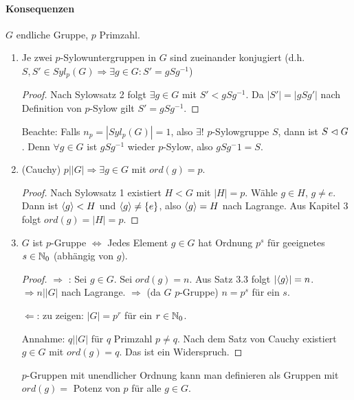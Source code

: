 \documentclass[12pt,a4paper]{scrartcl}
\begin{document}
\paragraph{Konsequenzen}
$G$ endliche Gruppe, $p$ Primzahl.
\begin{enumerate}
	\item Je zwei $p$-Sylowuntergruppen in $G$ sind zueinander konjugiert (d.h. $S, S'\in Syl_p(G) \Rightarrow \exists g\in G: S' = gSg^{-1}$)
	\begin{proof}
		Nach Sylowsatz 2 folgt $\exists g\in G$ mit $S'<gSg^{-1}$. Da $|S'| = |gSg'|$ nach Definition von $p$-Sylow gilt $S' = gSg^{-1}$.
	\end{proof}
	
	Beachte: Falls $n_p  = |Syl_p(G)| = 1$, also $\exists!$ $p$-Sylowgruppe $S$, dann ist $S\vartriangleleft G$. Denn $\forall g\in G$ ist $gSg^{-1}$ wieder $p$-Sylow, also $gSg^-1 = S$.
	
	\item (Cauchy) $p||G|\Rightarrow \exists g\in G$ mit $ord(g) = p$.
	\begin{proof}
		Nach Sylowsatz 1 existiert $H<G$ mit $|H| = p$. Wähle $g\in H$, $g\neq e$. Dann ist $\langle g\rangle <H$ und $\langle g\rangle \neq \{e\}$, also $\langle g\rangle = H$ nach Lagrange. Aus Kapitel 3 folgt $ord(g) = |H| = p$.
	\end{proof}
	\item $G$ ist $p$-Gruppe $\Leftrightarrow $ Jedes Element $g\in G$ hat Ordnung $p^s$ für geeignetes $s\in \mathbb N_0$ (abhängig von $g$).
	\begin{proof}
		\glqq$\Rightarrow$ \grqq: Sei $g\in G$. Sei $ord(g) = n$. Aus Satz 3.3 folgt $|\langle g\rangle| = n$. $\Rightarrow n||G|$ nach Lagrange. $\Rightarrow$ (da $G$ $p$-Gruppe) $n = p^s$ für ein $s$.
		
		\grqq $\Leftarrow$\grqq: zu zeigen: $|G| = p^r$ für ein $r\in\mathbb N_0$.
		
		Annahme: $q||G|$ für $q$ Primzahl $p\neq q$. Nach dem Satz von Cauchy existiert $g\in G$ mit $ord(g) = q$. Das ist ein Widerspruch.
	\end{proof}
	\begin{bem}
		$p$-Gruppen mit unendlicher Ordnung kann man definieren als Gruppen mit $ord(g) = $ Potenz von $p$ für alle $g\in G$.
	\end{bem}
	
\end{enumerate}
\end{document}
